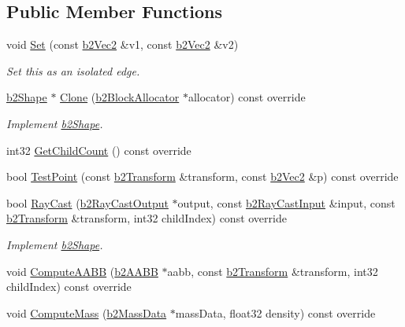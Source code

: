 \subsection*{Public Member Functions}
\begin{DoxyCompactItemize}
\item 
\mbox{\label{classb2EdgeShape_a67dd3b17630a600033cb4380697a4e9d}} 
void \mbox{\hyperlink{classb2EdgeShape_a67dd3b17630a600033cb4380697a4e9d}{Set}} (const \mbox{\hyperlink{structb2Vec2}{b2\+Vec2}} \&v1, const \mbox{\hyperlink{structb2Vec2}{b2\+Vec2}} \&v2)
\begin{DoxyCompactList}\small\item\em Set this as an isolated edge. \end{DoxyCompactList}\item 
\mbox{\label{classb2EdgeShape_a52ed696717f44ed02b7a88ccf201563c}} 
\mbox{\hyperlink{classb2Shape}{b2\+Shape}} $\ast$ \mbox{\hyperlink{classb2EdgeShape_a52ed696717f44ed02b7a88ccf201563c}{Clone}} (\mbox{\hyperlink{classb2BlockAllocator}{b2\+Block\+Allocator}} $\ast$allocator) const override
\begin{DoxyCompactList}\small\item\em Implement \mbox{\hyperlink{classb2Shape}{b2\+Shape}}. \end{DoxyCompactList}\item 
int32 \mbox{\hyperlink{classb2EdgeShape_ae9dcaa2f4b77fcf182d29159658da82a}{Get\+Child\+Count}} () const override
\item 
bool \mbox{\hyperlink{classb2EdgeShape_a15151673cf9ad585779c70363425f470}{Test\+Point}} (const \mbox{\hyperlink{structb2Transform}{b2\+Transform}} \&transform, const \mbox{\hyperlink{structb2Vec2}{b2\+Vec2}} \&p) const override
\item 
\mbox{\label{classb2EdgeShape_a192cf10bd556a5a90b29a2bcee2ddd75}} 
bool \mbox{\hyperlink{classb2EdgeShape_a192cf10bd556a5a90b29a2bcee2ddd75}{Ray\+Cast}} (\mbox{\hyperlink{structb2RayCastOutput}{b2\+Ray\+Cast\+Output}} $\ast$output, const \mbox{\hyperlink{structb2RayCastInput}{b2\+Ray\+Cast\+Input}} \&input, const \mbox{\hyperlink{structb2Transform}{b2\+Transform}} \&transform, int32 child\+Index) const override
\begin{DoxyCompactList}\small\item\em Implement \mbox{\hyperlink{classb2Shape}{b2\+Shape}}. \end{DoxyCompactList}\item 
void \mbox{\hyperlink{classb2EdgeShape_a238139ae1736b457d77443133ff16854}{Compute\+A\+A\+BB}} (\mbox{\hyperlink{structb2AABB}{b2\+A\+A\+BB}} $\ast$aabb, const \mbox{\hyperlink{structb2Transform}{b2\+Transform}} \&transform, int32 child\+Index) const override
\item 
void \mbox{\hyperlink{classb2EdgeShape_ac738c1e0ab2f4dfbab26e3942efa60af}{Compute\+Mass}} (\mbox{\hyperlink{structb2MassData}{b2\+Mass\+Data}} $\ast$mass\+Data, float32 density) const override
\end{DoxyCompactItemize}
